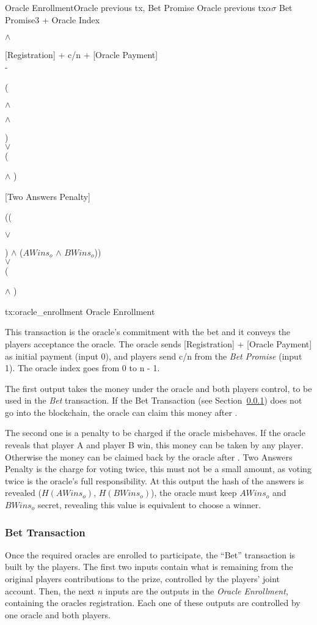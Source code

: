 \transaction%
    {Oracle Enrollment}{Oracle previous tx, Bet Promise}
   {Oracle previous tx}{$\alpha$}{$\sigma$}
   {Bet Promise}{3 + Oracle Index}{\signature{A} $\wedge$ \signature{B}}
    \stopinputs
   {[Registration] + c/n + [Oracle Payment] \\ - }
       {(\signature{Oracle} $\wedge$ \signature{A} $\wedge$ \signature{B}) \\
           $\vee$ \\
        (\signature{Oracle} $\wedge$ )}
   {[Two Answers Penalty]}{((\signature{A} $\vee$ \signature{B}) $\wedge$ %
                            ($AWins_o$ $\wedge$ $BWins_o$)) \\
                          $\vee$ \\
                      (\signature{Oracle} $\wedge$ )}
    \stopoutputs
    {tx:oracle_enrollment}
    {Oracle Enrollment}

This transaction is the oracle's commitment with the bet and it conveys the
  players acceptance the oracle.
The oracle sends [Registration] + [Oracle Payment] as initial payment
  (input 0), and players send c/n from the \textit{Bet Promise} (input 1).
The oracle index goes from 0 to n - 1.

The first output takes the money under the oracle and both players control, to
  be used in the \textit{Bet} transaction.
If the Bet Transaction (see Section~\ref{subsec:bet_transaction}) does not go
  into the blockchain, the oracle can claim this money after .

The second one is a penalty to be charged if the oracle misbehaves.
If the oracle reveals that player A and player B win, this money can be taken
  by any player. Otherwise the money can be claimed back by the oracle after
  .
Two Answers Penalty is the charge for voting twice, this must not be a small
  amount, as voting twice is the oracle's full responsibility.
At this output the hash of the answers is revealed ($H(AWins_o)$, $H(BWins_o)$),
  the oracle must keep $AWins_o$ and $BWins_o$ secret, revealing this value is
  equivalent to choose a winner.

\subsubsection{Bet Transaction} \label{subsec:bet_transaction}

Once the required oracles are enrolled to participate, the ``Bet'' transaction
  is built by the players.
 The first two inputs contain what is remaining from the original players
   contributions to the prize, controlled by the players' joint account.
Then, the next $n$ inputs are the outputs in the \textit{Oracle Enrollment},
  containing the oracles registration.
Each one of these outputs are controlled by one oracle and both players.

